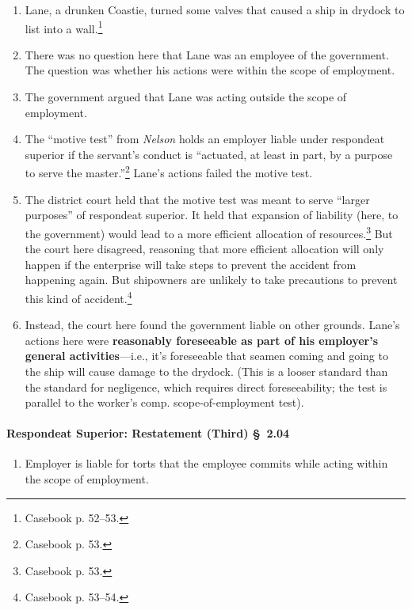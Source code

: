 \begin{enumerate}
    \item Lane, a drunken Coastie, turned some valves that caused a ship in 
    drydock to list into a wall.\footnote{Casebook p. 52--53.}
    \item There was no question here that Lane was an employee of the 
    government. The question was whether his actions were within the scope of 
    employment.
    \item The government argued that Lane was acting outside the scope of 
    employment.
    \item The ``motive test'' from \emph{Nelson} holds an employer liable 
    under respondeat superior if the servant's conduct is ``actuated, at least 
    in part, by a purpose to serve the master.''\footnote{Casebook p. 53.} 
    Lane's actions failed the motive test.
    \item The district court held that the motive test was meant to serve 
    ``larger purposes'' of respondeat superior. It held that expansion of 
    liability (here, to the government) would lead to a more efficient 
    allocation of resources.\footnote{Casebook p. 53.} But the court here 
    disagreed, reasoning that more efficient allocation will only happen if 
    the enterprise will take steps to prevent the accident from happening 
    again. But shipowners are unlikely to take precautions to prevent this 
    kind of accident.\footnote{Casebook p. 53--54.}
    \item Instead, the court here found the government liable on other 
    grounds. Lane's actions here were \textbf{reasonably foreseeable as part of his 
    employer's general activities}---i.e., it's foreseeable that seamen coming 
    and going to the ship will cause damage to the drydock. (This is a looser 
    standard than the standard for negligence, which requires direct 
    foreseeability; the test is parallel to the worker's comp. 
    scope-of-employment test).
\end{enumerate}

\paragraph{Respondeat Superior: Restatement (Third) \S\ 2.04}

\begin{enumerate}
    \item Employer is liable for torts that the employee commits while acting 
    within the scope of employment.
\end{enumerate}

